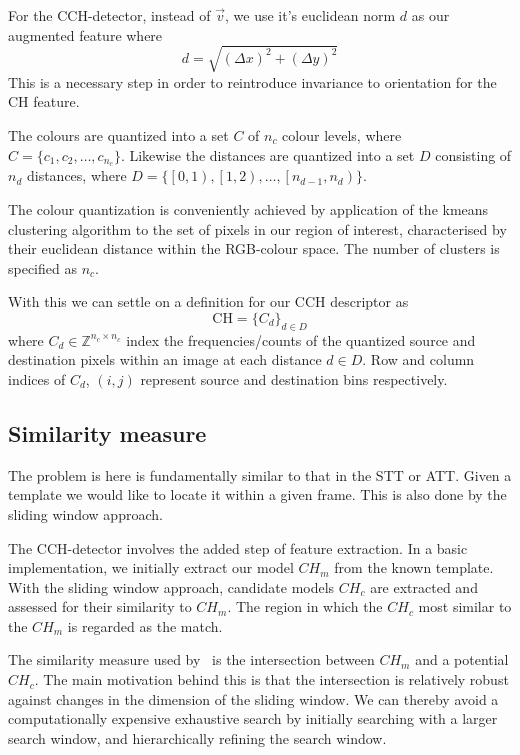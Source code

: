 For the CCH-detector, instead of $\vec{v}$, we use it's euclidean norm $d$ as our
augmented feature where 
\[d = \sqrt{{(\Delta{x})}^2 + {(\Delta{y})}^2}\] 
This is a necessary step in order to reintroduce invariance to orientation for
the CH feature. 

The colours are quantized into a set $C$ of $n_c$ colour levels, where 
$C = \{c_1,c_2,\dots,c_{n_c}\}$. Likewise the distances are quantized into
a set $D$ consisting of $n_d$ distances, where $ D = \{ \left[ 0,1
\right), \left[ 1,2 \right), \dots , \left[ n_{d-1}, n_{d} \right) \}$.

The colour quantization is conveniently achieved by application of the kmeans clustering
algorithm to the set of pixels in our region of interest, characterised by their
euclidean distance within the RGB-colour space. The number of clusters is
specified as $n_c$. 

With this we can settle on a definition for our CCH descriptor as
\[\text{CH} = {\{C_d\}}_{d \in D} \] 
where $C_d \in \mathbb{Z}^{n_c \times n_c}$ index the
frequencies/counts of the quantized source and destination pixels within an
image at each distance $d \in D$. Row and column indices of
$C_d$, $(i,j)$ represent source and destination bins respectively.  

\subsection{Similarity measure}\label{theoretical_framework_intersection}
The problem is here is fundamentally similar to that in the STT or ATT\@. 
Given a template we would like to locate it within a given frame.
This is also done by the sliding window approach.

The CCH-detector involves the added step of feature extraction. In a basic
implementation, we initially extract our model $CH_m$ from the known template.
With the sliding window approach, candidate models $CH_c$ are extracted and
assessed for their similarity to $CH_m$. The region in which the $CH_c$ most
similar to the $CH_m$ is regarded as the match. 

The similarity measure used by~\cite{Chang1999} is the 
intersection between $CH_m$ and a potential $CH_c$. The main motivation behind
this is that the intersection is relatively robust against changes in the
dimension of the sliding window.
We can thereby avoid a computationally expensive exhaustive search by initially
searching with a larger search window, and hierarchically refining the search
window.

